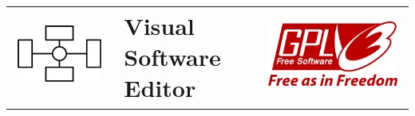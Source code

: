 \documentclass[a4paper,11pt,oneside]{book}
\begin{document}
	\author{}
	\title
	{
		{
			\begin{tabular}{>{\centering\arraybackslash}m{3.8 cm}l>{\centering\arraybackslash}m{3.8 cm}}
				\vspace{0.3 cm}\includegraphics[width=100 pt]{logo} & \textbf{Visual Software Editor} & \vspace{0.3 cm}\includegraphics[width=100 pt]{gplv3_logo_red}
			\end{tabular}
		}
	}
	\date{}
	\maketitle
\end{document}
